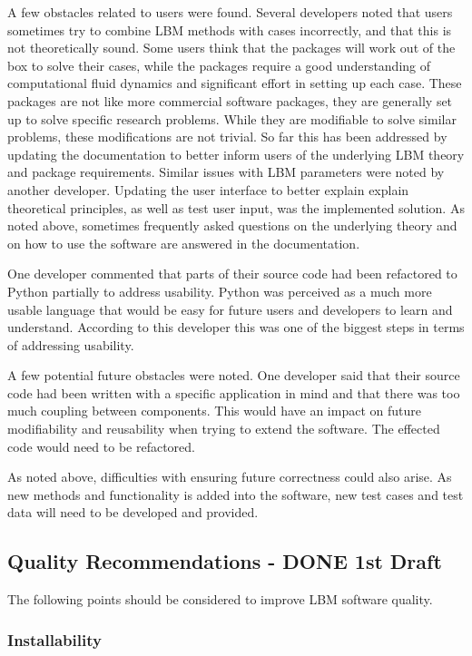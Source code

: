 \documentclass[12pt, notitlepage]{article}
\begin{document}
A few obstacles related to users were found. Several developers noted that users sometimes try to combine LBM methods with cases incorrectly, and that this is not theoretically sound. Some users think that the packages will work out of the box to solve their cases, while the packages require a good understanding of computational fluid dynamics and significant effort in setting up each case. These packages are not like more commercial software packages, they are generally set up to solve specific research problems. While they are modifiable to solve similar problems, these modifications are not trivial. So far this has been addressed by updating the documentation to better inform users of the underlying LBM theory and package requirements. Similar issues with LBM parameters were noted by another developer. Updating the user interface to better explain explain theoretical principles, as well as test user input, was the implemented solution. As noted above, sometimes frequently asked questions on the underlying theory and on how to use the software are answered in the documentation.

One developer commented that parts of their source code had been refactored to Python partially to address usability. Python was perceived as a much more usable language that would be easy for future users and developers to learn and understand. According to this developer this was one of the biggest steps in terms of addressing usability.

A few potential future obstacles were noted. One developer said that their source code had been written with a specific application in mind and that there was too much coupling between components. This would have an impact on future modifiability and reusability when trying to extend the software. The effected code would need to be refactored.

As noted above, difficulties with ensuring future correctness could also arise. As new methods and functionality is added into the software, new test cases and test data will need to be developed and provided.


\subsection{Quality Recommendations - DONE 1st Draft}\label{qualityrecommentations}

The following points should be considered to improve LBM software quality.

\subsubsection{Installability}
\end{document}

